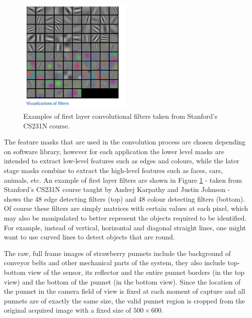 \documentclass[fleqn,twoside,12pt]{report}
\begin{document}
\begin{figure}
	\begin{center}
		\includegraphics[width=0.5\textwidth]{conv_filters.png}
	\end{center}
	\caption{Examples of first layer convolutional filters taken from Stanford's CS231N course.}
	\label{fig:conv_filters}
\end{figure} 





The feature masks that are used in the convolution process are chosen depending on software library, however for each application the lower level masks are intended to extract low-level features such as edges and colours, while the later stage masks combine to extract the high-level features such as faces, cars, animals, etc. An example of first layer filters are shown in Figure \ref{fig:conv_filters} - taken from Stanford's CS231N course taught by Andrej Karpathy and Justin Johnson \cite{andrej} - shows the 48 edge detecting filters (top) and 48 colour detecting filters (bottom). Of course these filters are simply matrices with certain values at each pixel, which may also be manipulated to better represent the objects required to be identified. For example, instead of vertical, horizontal and diagonal straight lines, one might want to use curved lines to detect objects that are round.





The raw, full frame images  of strawberry punnets include the background of conveyor belts and other mechanical parts of the system, they also include top-bottom view of the sensor, its reflector and the entire punnet borders (in the top view) and the bottom of the punnet (in the bottom view). Since the location of the punnet in the camera field of view is fixed at each moment of capture and all punnets are of exactly the same size, the valid punnet region is cropped from the original acquired image with a fixed size of $500 \times 600$. 
\end{document}
